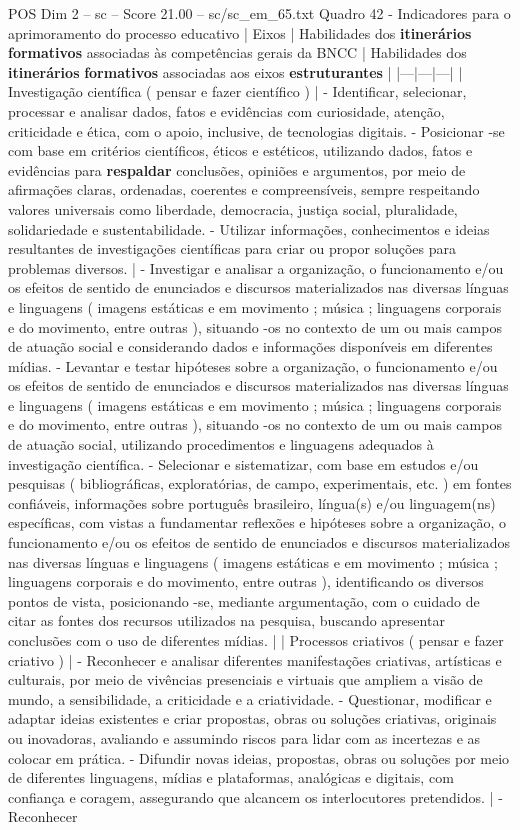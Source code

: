 \begin{textsample}{POS Dim 2 – sc – Score 21.00 – sc/sc\_em\_65.txt}
Quadro 42 - Indicadores para o aprimoramento do processo educativo | Eixos | Habilidades dos \textbf{itinerários} \textbf{formativos} associadas às competências gerais da BNCC | Habilidades dos \textbf{itinerários} \textbf{formativos} associadas aos eixos \textbf{estruturantes} | |---|---|---| | Investigação científica ( pensar e fazer científico ) | - Identificar, selecionar, processar e analisar dados, fatos e evidências com curiosidade, atenção, criticidade e ética, com o apoio, inclusive, de tecnologias digitais. - Posicionar -se com base em critérios científicos, éticos e estéticos, utilizando dados, fatos e evidências para \textbf{respaldar} conclusões, opiniões e argumentos, por meio de afirmações claras, ordenadas, coerentes e compreensíveis, sempre respeitando valores universais como liberdade, democracia, justiça social, pluralidade, solidariedade e sustentabilidade. - Utilizar informações, conhecimentos e ideias resultantes de investigações científicas para criar ou propor soluções para problemas diversos. | - Investigar e analisar a organização, o funcionamento e/ou os efeitos de sentido de enunciados e discursos materializados nas diversas línguas e linguagens ( imagens estáticas e em movimento ; música ; linguagens corporais e do movimento, entre outras ), situando -os no contexto de um ou mais campos de atuação social e considerando dados e informações disponíveis em diferentes mídias. - Levantar e testar hipóteses sobre a organização, o funcionamento e/ou os efeitos de sentido de enunciados e discursos materializados nas diversas línguas e linguagens ( imagens estáticas e em movimento ; música ; linguagens corporais e do movimento, entre outras ), situando -os no contexto de um ou mais campos de atuação social, utilizando procedimentos e linguagens adequados à investigação científica. - Selecionar e sistematizar, com base em estudos e/ou pesquisas ( bibliográficas, exploratórias, de campo, experimentais, etc. ) em fontes confiáveis, informações sobre português brasileiro, língua(s) e/ou linguagem(ns) específicas, com vistas a fundamentar reflexões e hipóteses sobre a organização, o funcionamento e/ou os efeitos de sentido de enunciados e discursos materializados nas diversas línguas e linguagens ( imagens estáticas e em movimento ; música ; linguagens corporais e do movimento, entre outras ), identificando os diversos pontos de vista, posicionando -se, mediante argumentação, com o cuidado de citar as fontes dos recursos utilizados na pesquisa, buscando apresentar conclusões com o uso de diferentes mídias. | | Processos criativos ( pensar e fazer criativo ) | - Reconhecer e analisar diferentes manifestações criativas, artísticas e culturais, por meio de vivências presenciais e virtuais que ampliem a visão de mundo, a sensibilidade, a criticidade e a criatividade. - Questionar, modificar e adaptar ideias existentes e criar propostas, obras ou soluções criativas, originais ou inovadoras, avaliando e assumindo riscos para lidar com as incertezas e as colocar em prática. - Difundir novas ideias, propostas, obras ou soluções por meio de diferentes linguagens, mídias e plataformas, analógicas e digitais, com confiança e coragem, assegurando que alcancem os interlocutores pretendidos. | - Reconhecer 
\end{textsample}
